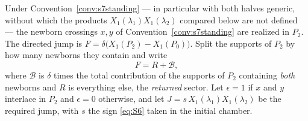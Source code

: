 \begin{definition}\label{def:sectors}
Under Convention~\ref{conv:s7standing} --- in particular with both halves
generic, without which the products $X_1(\lambda_1)X_1(\lambda_2)$ compared
below are not defined --- the newborn crossings $x,y$ of
Convention~\ref{conv:s7standing} are realized in $P_2$. The directed jump is
$F=\delta\bigl(X_1(P_2)-X_1(P_0)\bigr)$. Split the supports of $P_2$ by how
many newborns they contain and write
\[
   F=R+\mathcal B,
\]
where $\mathcal B$ is $\delta$ times the total contribution of the supports of
$P_2$ containing \emph{both} newborns and $R$ is everything else, the
\emph{returned} sector. Let $\epsilon=1$ if $x$ and $y$ interlace in $P_2$ and
$\epsilon=0$ otherwise, and let $J=s\,X_1(\lambda_1)X_1(\lambda_2)$ be the
required jump, with $s$ the sign \eqref{eq:S6} taken in the initial chamber.
\end{definition}

